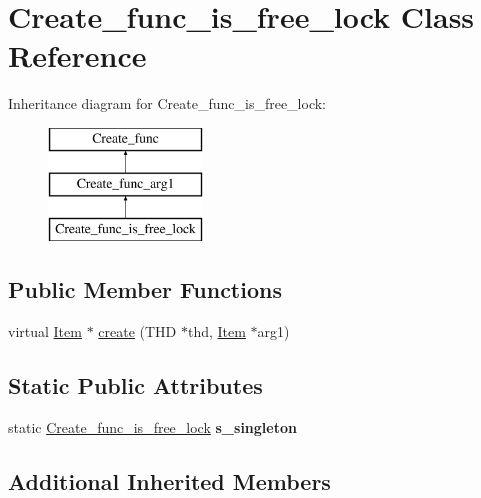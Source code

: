 \hypertarget{classCreate__func__is__free__lock}{}\section{Create\+\_\+func\+\_\+is\+\_\+free\+\_\+lock Class Reference}
\label{classCreate__func__is__free__lock}
Inheritance diagram for Create\+\_\+func\+\_\+is\+\_\+free\+\_\+lock\+:\begin{figure}[H]
\begin{center}
\leavevmode
\includegraphics[height=3.000000cm]{classCreate__func__is__free__lock}
\end{center}
\end{figure}
\subsection*{Public Member Functions}
\begin{DoxyCompactItemize}
\item 
virtual \mbox{\hyperlink{classItem}{Item}} $\ast$ \mbox{\hyperlink{classCreate__func__is__free__lock_a15bf9cc8420b6387216eb0718d2e9fc0}{create}} (T\+HD $\ast$thd, \mbox{\hyperlink{classItem}{Item}} $\ast$arg1)
\end{DoxyCompactItemize}
\subsection*{Static Public Attributes}
\begin{DoxyCompactItemize}
\item 
\mbox{\label{classCreate__func__is__free__lock_aef31d26de0edad7751582778edf21417}} 
static \mbox{\hyperlink{classCreate__func__is__free__lock}{Create\+\_\+func\+\_\+is\+\_\+free\+\_\+lock}} {\bfseries s\+\_\+singleton}
\end{DoxyCompactItemize}
\subsection*{Additional Inherited Members}



